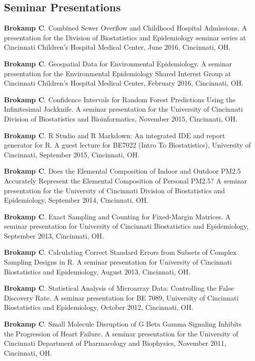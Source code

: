\documentclass[margin,line]{res}
\newenvironment{list3}{
  \begin{list}{}{%
      \setlength{\itemsep}{0in}
      \setlength{\parsep}{0in} \setlength{\parskip}{0in}
      \setlength{\topsep}{0in} \setlength{\partopsep}{0in} 
      \setlength{\leftmargin}{0in}}}{\end{list}}
\begin{document}
\begin{resume}
\section{\sc Seminar Presentations}
\begin{list3} \itemsep 4pt
\item[] \textbf{Brokamp C}. Combined Sewer Overflow and Childhood Hospital Admissions. A presentation for the Division of Biostatistics and Epidemiology seminar series at Cincinnati Children's Hospital Medical Center, June 2016, Cincinnati, OH.
\item[] \textbf{Brokamp C}. Geospatial Data for Environmental Epidemiology. A seminar presentation for the Environmental Epidemiology Shared Interest Group at Cincinnati Children's Hospital Medical Center, February 2016, Cincinnati, OH.
\item[] \textbf{Brokamp C}. Confidence Intervals for Random Forest Predictions Using the Infinitesimal Jackknife. A seminar presentation for the University of Cincinnati Division of Biostatistics and Bioinformatics, November 2015, Cincinnati, OH.
\item[] \textbf{Brokamp C}. R Studio and R Markdown: An integrated IDE and report generator for R. A guest lecture for BE7022 (Intro To Biostatistics), University of Cincinnati, September 2015, Cincinnati, OH.
\item[] \textbf{Brokamp C}. Does the Elemental Composition of Indoor and Outdoor PM2.5 Accurately Represent the Elemental Composition of Personal PM2.5? A seminar presentation for the University of Cincinnati Division of Biostatistics and Epidemiology, September 2014, Cincinnati, OH. 
\item[] \textbf{Brokamp C}. Exact Sampling and Counting for Fixed-Margin Matrices.  A seminar presentation for University of Cincinnati Biostatistics and Epidemiology, September 2013, Cincinnati, OH.
\item[] \textbf{Brokamp C}. Calculating Correct Standard Errors from Subsets of Complex Sampling Designs in R.  A seminar presentation for University of Cincinnati Biostatistics and Epidemiology, August 2013, Cincinnati, OH.
\item[] \textbf{Brokamp C}. Statistical Analysis of Microarray Data: Controlling the False Discovery Rate.  A seminar presentation for BE 7089, University of Cincinnati Biostatistics and Epidemiology, October 2012, Cincinnati, OH.
\item[] \textbf{Brokamp C}. Small Molecule Disruption of G Beta Gamma Signaling Inhibits the Progression of Heart Failure.  A seminar presentation for the University of Cincinnati Department of Pharmacology and Biophysics, November 2011, Cincinnati, OH.

\end{list3}
\end{resume}
\end{document}
